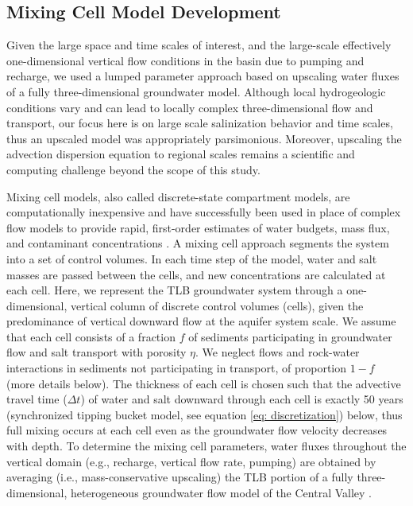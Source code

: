 %
%
\subsection{Mixing Cell Model Development}
\label{ss_2_3}

Given the large space and time scales of interest, and the large-scale effectively one-dimensional vertical flow conditions in the basin due to pumping and recharge, we used a lumped parameter approach based on upscaling water fluxes of a fully three-dimensional groundwater model. %
Although local hydrogeologic conditions vary and can lead to locally complex three-dimensional flow and transport, our focus here is on large scale salinization behavior and time scales, thus an upscaled model was appropriately parsimonious. %
Moreover, upscaling the advection dispersion equation to regional scales remains a scientific and computing challenge \citep{guo2019adaptive, guo2019upscaling} beyond the scope of this study.

Mixing cell models, also called discrete-state compartment models, are computationally inexpensive and have successfully been used in place of complex flow models to provide rapid, first-order estimates of water budgets, mass flux, and contaminant concentrations \citep{Campana1975, Campana1984, Campana1987, Carroll2008, Kirk1990}. A mixing cell approach segments the system into a set of control volumes. In each time step of the model, water and salt masses are passed between the cells, and new concentrations are calculated at each cell. Here, we represent the TLB groundwater system through a one-dimensional, vertical column of discrete control volumes (cells), given the predominance of vertical downward flow at the aquifer system scale. We assume that each cell consists of a fraction $f$ of sediments participating in groundwater flow and salt transport with porosity $\eta$. We neglect flows and rock-water interactions in sediments not participating in transport, of proportion $1-f$ (more details below). The thickness of each cell is chosen such that the advective travel time ($\Delta t$) of water and salt downward through each cell is exactly 50 years (synchronized tipping bucket model, see equation \ref{eq: discretization}) below, thus full mixing occurs at each cell even as the groundwater flow velocity decreases with depth. To determine the mixing cell parameters, water fluxes throughout the vertical domain (e.g., recharge, vertical flow rate, pumping) are obtained by averaging (i.e., mass-conservative upscaling) the TLB portion of a fully three-dimensional, heterogeneous groundwater flow model of the Central Valley \citep{Brush2013}.  

